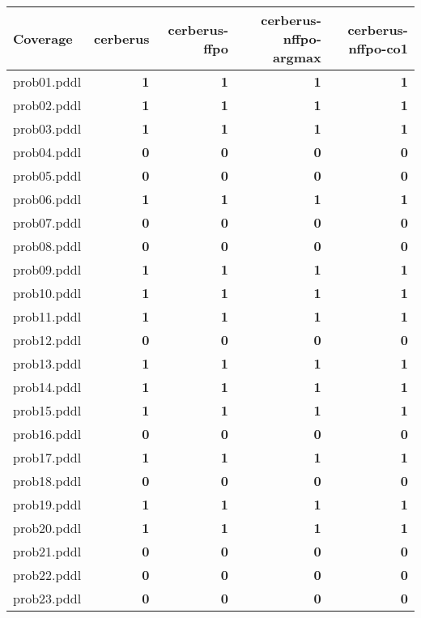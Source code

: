 \documentclass{article}
\begin{document}
\begin{tabular}{@{}lrrrr@{}}
Coverage & cerberus & cerberus-ffpo & cerberus-nffpo-argmax & cerberus-nffpo-co1 \\
\midrule
prob01.pddl & \textbf{1} & \textbf{1} & \textbf{1} & \textbf{1} \\
prob02.pddl & \textbf{1} & \textbf{1} & \textbf{1} & \textbf{1} \\
prob03.pddl & \textbf{1} & \textbf{1} & \textbf{1} & \textbf{1} \\
prob04.pddl & \textbf{0} & \textbf{0} & \textbf{0} & \textbf{0} \\
prob05.pddl & \textbf{0} & \textbf{0} & \textbf{0} & \textbf{0} \\
prob06.pddl & \textbf{1} & \textbf{1} & \textbf{1} & \textbf{1} \\
prob07.pddl & \textbf{0} & \textbf{0} & \textbf{0} & \textbf{0} \\
prob08.pddl & \textbf{0} & \textbf{0} & \textbf{0} & \textbf{0} \\
prob09.pddl & \textbf{1} & \textbf{1} & \textbf{1} & \textbf{1} \\
prob10.pddl & \textbf{1} & \textbf{1} & \textbf{1} & \textbf{1} \\
prob11.pddl & \textbf{1} & \textbf{1} & \textbf{1} & \textbf{1} \\
prob12.pddl & \textbf{0} & \textbf{0} & \textbf{0} & \textbf{0} \\
prob13.pddl & \textbf{1} & \textbf{1} & \textbf{1} & \textbf{1} \\
prob14.pddl & \textbf{1} & \textbf{1} & \textbf{1} & \textbf{1} \\
prob15.pddl & \textbf{1} & \textbf{1} & \textbf{1} & \textbf{1} \\
prob16.pddl & \textbf{0} & \textbf{0} & \textbf{0} & \textbf{0} \\
prob17.pddl & \textbf{1} & \textbf{1} & \textbf{1} & \textbf{1} \\
prob18.pddl & \textbf{0} & \textbf{0} & \textbf{0} & \textbf{0} \\
prob19.pddl & \textbf{1} & \textbf{1} & \textbf{1} & \textbf{1} \\
prob20.pddl & \textbf{1} & \textbf{1} & \textbf{1} & \textbf{1} \\
prob21.pddl & \textbf{0} & \textbf{0} & \textbf{0} & \textbf{0} \\
prob22.pddl & \textbf{0} & \textbf{0} & \textbf{0} & \textbf{0} \\
prob23.pddl & \textbf{0} & \textbf{0} & \textbf{0} & \textbf{0} \\

\end{tabular}
\end{document}
